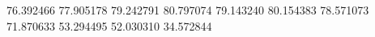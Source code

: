 76.392466
77.905178
79.242791
80.797074
79.143240
80.154383
78.571073
71.870633
53.294495
52.030310
34.572844
